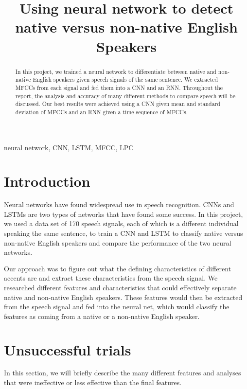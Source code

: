 \documentclass{article}
\title{Using neural network to detect native versus non-native English Speakers}
\begin{document}

\maketitle

\begin{abstract}
	In this project, we trained a neural network to differentiate between native and non-native English speakers given speech signals of the same sentence.
	We extracted MFCCs from each signal and fed them into a CNN and an RNN.
	Throughout the report, the analysis and accuracy of many different methods to compare speech will be discussed. 
	Our best results were achieved using a CNN given mean and standard deviation of MFCCs and an RNN given a time sequence of MFCCs.
\end{abstract}

\begin{keywords}
neural network,
CNN,
LSTM,
MFCC,
LPC
\end{keywords}

\section{Introduction}
\label{sec:intro}

Neural networks have found widespread use in speech recognition.
CNNs \cite{microsoft} and LSTMs \cite{google} are two types of networks that have found some success. 
In this project, we used a data set of 170 speech signals, each of which is a different individual speaking the same sentence, to train a CNN and LSTM to classify native versus non-native English speakers and compare the performance of the two neural networks. 

Our approach was to figure out what the defining characteristics of different accents are and extract these characteristics from the speech signal.
We researched different features and characteristics that could effectively separate native and non-native English speakers.
These features would then be extracted from the speech signal and fed into the neural net, which would classify the features as coming from a native or a non-native English speaker.

\section{Unsuccessful trials}
\label{sec:unsuccessful}

In this section, we will briefly describe the many different features and analyses that were ineffective or less effective than the final features.
\end{document}
